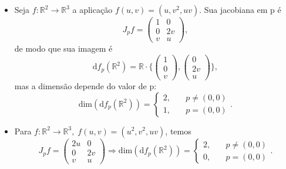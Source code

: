 \documentclass[../differential_geometry.tex]{subfiles}
\begin{document}
\begin{example}
\begin{itemize}
		\item[3)] Seja \(f:\mathbb{R}^{2}\rightarrow \mathbb{R}^{3}\) a aplicação \(f(u, v)=(u, v^{2}, uv)\). Sua jacobiana em p é
		      \[
			      J_{p}f=\begin{pmatrix}
				      1 & 0  \\
				      0 & 2v \\
				      v & u
			      \end{pmatrix},
		      \]
		      de modo que sua imagem é
		      \[
			      \mathrm{d}f_{p}(\mathbb{R}^{2})=\mathbb{R}\cdot \biggl\{\begin{pmatrix}
				      1 \\
				      0 \\
				      v
			      \end{pmatrix}, \begin{pmatrix}
				      0  \\
				      2v \\
				      u
			      \end{pmatrix}\biggr\},
		      \]
		      mas a dimensão depende do valor de p:
		      \[
			      \mathrm{dim}(\mathrm{d}f_{p}(\mathbb{R}^{2})) = \left\{\begin{array}{ll}
				      2, & \quad p\neq (0,0) \\
				      1, & \quad p=(0,0)
			      \end{array}\right..
		      \]
		\item[4)] Para \(f:\mathbb{R}^{2}\rightarrow \mathbb{R}^{3},\; f(u, v)=(u^{2}, v^{2}, uv)\), temos
		      \[
			      J_{p}f=\begin{pmatrix}
				      2u & 0  \\
				      0  & 2v \\
				      v  & u
			      \end{pmatrix} \Rightarrow \mathrm{dim}(\mathrm{d}f_{p}(\mathbb{R}^{2})) = \left\{\begin{array}{ll}
				      2, & \quad p\neq (0,0) \\
				      0, & \quad p=(0,0)
			      \end{array}\right..
		      \]
	\end{itemize}
\end{example}
\end{document}
